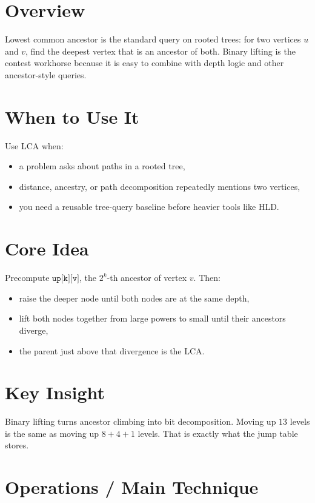 \section*{Overview}

Lowest common ancestor is the standard query on rooted trees: for two vertices \(u\) and \(v\), find the deepest
vertex that is an ancestor of both. Binary lifting is the contest workhorse because it is easy to combine with depth
logic and other ancestor-style queries.

\section*{When to Use It}

Use LCA when:

\begin{itemize}
  \item a problem asks about paths in a rooted tree,
  \item distance, ancestry, or path decomposition repeatedly mentions two vertices,
  \item you need a reusable tree-query baseline before heavier tools like HLD.
\end{itemize}

\section*{Core Idea}

Precompute \(\texttt{up[k][v]}\), the \(2^k\)-th ancestor of vertex \(v\). Then:

\begin{itemize}
  \item raise the deeper node until both nodes are at the same depth,
  \item lift both nodes together from large powers to small until their ancestors diverge,
  \item the parent just above that divergence is the LCA.
\end{itemize}

\section*{Key Insight}

Binary lifting turns ancestor climbing into bit decomposition. Moving up \(13\) levels is the same as moving up
\(8 + 4 + 1\) levels. That is exactly what the jump table stores.

\section*{Operations / Main Technique}

